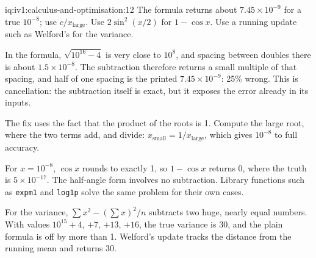 \begin{solution}{iq:iv1:calculus-and-optimisation:12}
The formula returns about $7.45 \times 10^{-9}$ for a true $10^{-8}$; use $c/x_{\text{large}}$. Use $2\sin^2(x/2)$ for $1 - \cos x$. Use a running update such as Welford's for the variance.

In the formula, $\sqrt{10^{16} - 4}$ is very close to $10^8$, and spacing between doubles there is about $1.5 \times 10^{-8}$. The subtraction therefore returns a small multiple of that spacing, and half of one spacing is the printed $7.45 \times 10^{-9}$: 25\% wrong. This is cancellation: the subtraction itself is exact, but it exposes the error already in its inputs.

The fix uses the fact that the product of the roots is 1. Compute the large root, where the two terms add, and divide: $x_{\text{small}} = 1/x_{\text{large}}$, which gives $10^{-8}$ to full accuracy.

For $x = 10^{-8}$, $\cos x$ rounds to exactly 1, so $1 - \cos x$ returns 0, where the truth is $5 \times 10^{-17}$. The half-angle form involves no subtraction. Library functions such as \texttt{expm1} and \texttt{log1p} solve the same problem for their own cases.

For the variance, $\sum x^2 - (\sum x)^2/n$ subtracts two huge, nearly equal numbers. With values $10^{15} + 4$, $+7$, $+13$, $+16$, the true variance is 30, and the plain formula is off by more than 1. Welford's update tracks the distance from the running mean and returns 30.



\end{solution}

